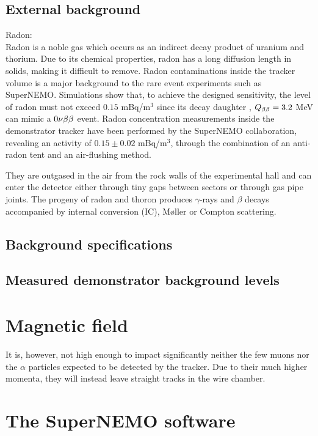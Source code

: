 \subsection{External background}
\label{subsec:SNexternal_bkg}

Radon:\\
Radon is a noble gas which occurs as an indirect decay product of uranium and thorium.
Due to its chemical properties, radon has a long diffusion length in solids, making it difficult to remove.
Radon contaminations inside the tracker volume is a major background to the rare event experiments such as SuperNEMO.
Simulations show that, to achieve the designed sensitivity, the level of radon must not exceed $0.15$ mBq/m$^{3}$ since its decay daughter \Bi, $Q_{\beta\beta}= 3.2$ MeV can mimic a $0\nu\beta\beta$ event.
Radon concentration measurements inside the demonstrator tracker have been performed by the SuperNEMO collaboration, revealing an activity of $0.15\pm0.02$ mBq/m$^{3}$, through the combination of an anti-radon tent and an air-flushing method.

They are outgased in the air from the rock walls of the experimental hall and can enter the detector either through tiny gaps between sectors or through gas pipe joints.
The progeny of radon and thoron produces $\gamma$-rays and $\beta$ decays accompanied by internal conversion (IC), Møller or Compton scattering.
\subsection{Background specifications}
\subsection{Measured demonstrator background levels}

\section{Magnetic field}
\label{sec:magnetic_field}

It is, however, not high enough to impact significantly neither the few muons nor the $\alpha$ particles expected to be detected by the tracker.
Due to their much higher momenta, they will instead leave straight tracks in the wire chamber.

\section{The SuperNEMO software}
\label{sec:SNsoftware}
